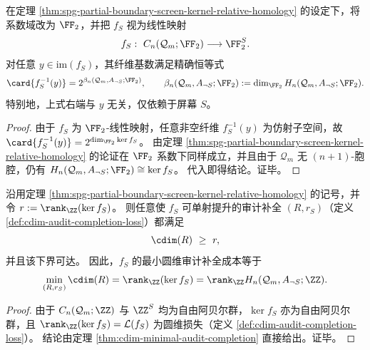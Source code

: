 \begin{corollary}\label{cor:spg-partial-boundary-fiber-cardinality-f2}
在定理 \ref{thm:spg-partial-boundary-screen-kernel-relative-homology} 的设定下，将系数域改为 \(\FF_2\)，并把 \(f_S\) 视为线性映射
\[
f_S:\ C_n(\mathcal Q_m;\FF_2)\longrightarrow \FF_2^{S}.
\]
对任意 \(y\in \mathrm{im}(f_S)\)，其纤维基数满足精确恒等式
\[
\card{f_S^{-1}(y)}=2^{\beta_n(\mathcal Q_m,A_{\neg S};\FF_2)},
\qquad
\beta_n(\mathcal Q_m,A_{\neg S};\FF_2):=\dim_{\FF_2}H_n(\mathcal Q_m,A_{\neg S};\FF_2).
\]
特别地，上式右端与 \(y\) 无关，仅依赖于屏幕 \(S\)。
\end{corollary}
\begin{proof}
由于 \(f_S\) 为 \(\FF_2\)-线性映射，任意非空纤维 \(f_S^{-1}(y)\) 为仿射子空间，故
\(
\card{f_S^{-1}(y)}=2^{\dim_{\FF_2}\ker f_S}
\)。
由定理 \ref{thm:spg-partial-boundary-screen-kernel-relative-homology} 的论证在 \(\FF_2\) 系数下同样成立，并且由于 \(\mathcal Q_m\) 无 \((n+1)\)-胞腔，仍有
\(
H_n(\mathcal Q_m,A_{\neg S};\FF_2)\cong \ker f_S
\)。
代入即得结论。证毕。
\end{proof}

\begin{corollary}[最小审计补全成本等于屏幕核秩]\label{cor:spg-partial-boundary-min-audit-cost-kernel-rank}
沿用定理 \ref{thm:spg-partial-boundary-screen-kernel-relative-homology} 的记号，并令 \(r:=\rank_{\ZZ}(\ker f_S)\)。
则任意使 \(f_S\) 可单射提升的审计补全 \((R,r_S)\)（定义 \ref{def:cdim-audit-completion-loss}）都满足
\[
\cdim(R)\ \ge\ r,
\]
并且该下界可达。
因此，\(f_S\) 的最小圆维审计补全成本等于
\[
\min_{(R,r_S)}\cdim(R)=\rank_{\ZZ}(\ker f_S)=\rank_{\ZZ}H_n(\mathcal Q_m,A_{\neg S};\ZZ).
\]
\end{corollary}
\begin{proof}
由于 \(C_n(\mathcal Q_m;\ZZ)\) 与 \(\ZZ^{S}\) 均为自由阿贝尔群，\(\ker f_S\) 亦为自由阿贝尔群，且
\(
\rank_{\ZZ}(\ker f_S)=\mathcal L(f_S)
\)
为圆维损失（定义 \ref{def:cdim-audit-completion-loss}）。
结论由定理 \ref{thm:cdim-minimal-audit-completion} 直接给出。证毕。
\end{proof}

